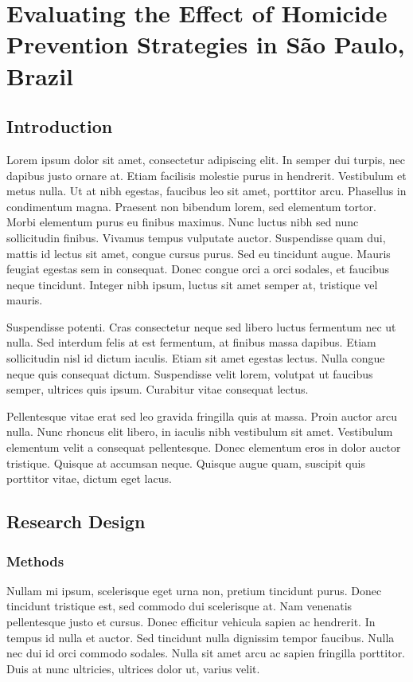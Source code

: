 \chapter{Evaluating the Effect of Homicide Prevention Strategies in São Paulo, Brazil}
\label{chap:synth}

\section{Introduction}
\label{sec:intro1}

Lorem ipsum dolor sit amet, consectetur adipiscing elit. In semper dui turpis, nec dapibus justo ornare at. Etiam facilisis molestie purus in hendrerit. Vestibulum et metus nulla. Ut at nibh egestas, faucibus leo sit amet, porttitor arcu. Phasellus in condimentum magna. Praesent non bibendum lorem, sed elementum tortor. Morbi elementum purus eu finibus maximus. Nunc luctus nibh sed nunc sollicitudin finibus. Vivamus tempus vulputate auctor. Suspendisse quam dui, mattis id lectus sit amet, congue cursus purus. Sed eu tincidunt augue. Mauris feugiat egestas sem in consequat. Donec congue orci a orci sodales, et faucibus neque tincidunt. Integer nibh ipsum, luctus sit amet semper at, tristique vel mauris.

Suspendisse potenti. Cras consectetur neque sed libero luctus fermentum nec ut nulla. Sed interdum felis at est fermentum, at finibus massa dapibus. Etiam sollicitudin nisl id dictum iaculis. Etiam sit amet egestas lectus. Nulla congue neque quis consequat dictum. Suspendisse velit lorem, volutpat ut faucibus semper, ultrices quis ipsum. Curabitur vitae consequat lectus.

Pellentesque vitae erat sed leo gravida fringilla quis at massa. Proin auctor arcu nulla. Nunc rhoncus elit libero, in iaculis nibh vestibulum sit amet. Vestibulum elementum velit a consequat pellentesque. Donec elementum eros in dolor auctor tristique. Quisque at accumsan neque. Quisque augue quam, suscipit quis porttitor vitae, dictum eget lacus.


\section{Research Design}
\label{sec:research}

\subsection{Methods}
\label{sub:methods}
Nullam mi ipsum, scelerisque eget urna non, pretium tincidunt purus. Donec tincidunt tristique est, sed commodo dui scelerisque at. Nam venenatis pellentesque justo et cursus. Donec efficitur vehicula sapien ac hendrerit. In tempus id nulla et auctor. Sed tincidunt nulla dignissim tempor faucibus. Nulla nec dui id orci commodo sodales. Nulla sit amet arcu ac sapien fringilla porttitor. Duis at nunc ultricies, ultrices dolor ut, varius velit.

